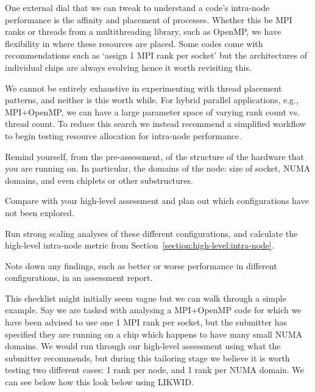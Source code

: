 
One external dial that we can tweak to understand a code's intra-node
performance is the affinity and placement of processes. Whether this be MPI
ranks or threads from a multithreading library, such as OpenMP, we have
flexibility in where these resources are placed. Some codes come with
recommendations such as `assign 1 MPI rank per socket' but the architectures of
individual chips are always evolving hence it worth revisiting this.

We cannot be entirely exhaustive in experimenting with thread placement
patterns, and neither is this worth while. For hybrid parallel applications,
e.g., MPI+OpenMP, we can have a large parameter space of varying rank count vs.
thread count. To reduce this search we instead recommend a simplified workflow
to begin testing resource allocation for intra-node performance.

\begin{checklist}
 \item Remind yourself, from the pre-assessment, of the structure of the
	 hardware that you are running on. In particular, the domains of the
	 node: size of socket, NUMA domains, and even chiplets or other
	 substructures.
 \item Compare with your high-level assessment and plan out which
	 configurations have not been explored.
 \item Run strong scaling analyses of these different configurations, and
	 calculate the high-level intra-node metric from
	 Section~\ref{section:high-level:intra-node}. 
 \item Note down any findings, such as better or worse performance in different
	 configurations, in an assessment report.
\end{checklist}

This checklist might initially seem vague but we can walk through a simple
example. Say we are tasked with analysing a MPI+OpenMP code for which we have
been advised to use one 1 MPI rank per socket, but the submitter has specified
they are running on a chip which happens to have many small NUMA domains. We
would run through our high-level assessment using what the submitter
recommends, but during this tailoring stage we believe it is worth testing two
different cases: 1 rank per node, and 1 rank per NUMA domain. We can see below
how this look below using LIKWID.

